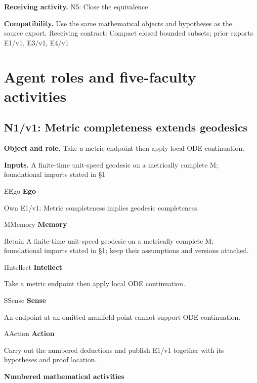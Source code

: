 \documentclass[preprint,12pt,aps,pra,showkeys,amsmath,amssymb,superscriptaddress,floatfix]{revtex4-2}
\theoremstyle{definition}
\theoremstyle{remark}
\newcommand{\mmfaculty}[3]{%
 \begin{mmfacultybox}{#1}{#2}
 {\sffamily\bfseries\color{MMBlue}#2}\par\smallskip #3
 \end{mmfacultybox}}
\newcommand{\field}[2]{\par\smallskip\noindent\textbf{#1.} #2\par}
\begin{document}
\field{Receiving activity}{N5: Close the equivalence}

\field{Compatibility}{Use the same mathematical objects and hypotheses as the source export.
Receiving contract: Compact closed bounded subsets; prior exports E1/v1,
E3/v1, E4/v1}

\endgroup

\clearpage\section{Agent roles and five-faculty activities}\begingroup\small\linespread{1.05}\selectfont{}

\subsection{N1/v1: Metric completeness extends geodesics}

\field{Object and role}{Take a metric endpoint then apply local ODE continuation.}

\field{Inputs}{A finite-time unit-speed geodesic on a metrically complete M;
foundational imports stated in §1}

\mmfaculty{E}{Ego}{Own E1/v1: Metric completeness implies geodesic completeness.}

\mmfaculty{M}{Memory}{Retain A finite-time unit-speed geodesic on a metrically complete M;
foundational imports stated in §1; keep their assumptions and versions
attached.}

\mmfaculty{I}{Intellect}{Take a metric endpoint then apply local ODE continuation.}

\mmfaculty{S}{Sense}{An endpoint at an omitted manifold point cannot support ODE
continuation.}

\mmfaculty{A}{Action}{Carry out the numbered deductions and publish E1/v1 together with its
hypotheses and proof location.}

\smallskip\noindent\textbf{Numbered mathematical activities}
\end{document}
